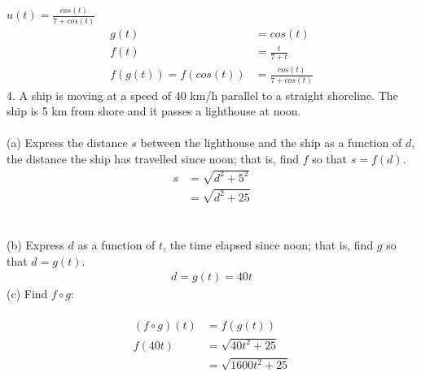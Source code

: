 \documentclass{article}
\begin{document}
$u(t) = \frac{cos(t)}{7 + cos(t)}$\\
\begin{equation}
\begin{split}
    g(t) & = cos(t)\\
    f(t) & = \frac{t}{7 + t}\\
    f(g(t)) = f(cos(t)) & = \frac{cos(t)}{7 + cos(t)}
\end{split}
\end{equation}
4. A ship is moving at a speed of 40 km/h parallel to a straight shoreline. The ship is 5 km from shore and it passes a lighthouse at noon.\\\\
(a) Express the distance $s$ between the lighthouse and the ship as a function of $d$, the distance the ship has travelled since noon; that is, find $f$ so that $s = f(d)$.\\
\begin{equation}
\begin{split}
    s & = \sqrt{d^2 + 5^2}\\
    & = \sqrt{d^2 + 25}
\end{split}
\end{equation}
\\\\
(b) Express $d$ as a function of $t$, the time elapsed since noon; that is, find $g$ so that 
$d = g(t)$.\\
\begin{equation}
\begin{split}
    d = g(t) = 40t
\end{split}
\end{equation}
(c) Find $f \circ g$:\\\\
\begin{equation}
\begin{split}
    (f \circ g)(t) & = f(g(t))\\
    f(40t) & = \sqrt{40t^2 + 25}\\
    & = \sqrt{1600t^2 + 25}
\end{split}
\end{equation}
\end{document}
